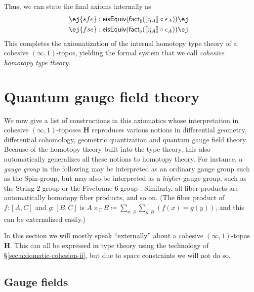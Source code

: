 \documentclass[copyright,12pt]{eptcs}
\makeatletter
\newcommand{\type}{\ensuremath{\mathsf{Type}}\xspace}
\renewcommand{\H}{\ensuremath{\mathbf{H}}\xspace}
\newcommand{\io}{\ensuremath{(\infty,1)}}
\newcommand{\factsharp}{\textsf{fact}_{\sharp}}
\newcommand{\factflat}{\textsf{fact}_{\flat}}
\def\jd#1{\@jd#1\ej}
\def\@jd#1|-#2\ej{\@@jd#1,,\;\vdash\;\left(#2\right)}
\def\@@jd#1,{\@ifmtarg{#1}{\let\next=\relax}{\left(#1\right)\let\next=\@@@jd}\next}
\def\@@@jd#1,{\@ifmtarg{#1}{\let\next=\relax}{,\,\left(#1\right)\let\next=\@@@jd}\next}
\makeatother
\begin{document}
Thus, we can state the final axioms internally as
\begin{gather}
  \jd{A:\sharp\type |- \mathsf{sfe}:\mathsf{eisEquiv} (\factsharp (\llbracket\eta_A\rrbracket \circ \epsilon_A))} \\
  \jd{A:\sharp\type |- \mathsf{fse}:\mathsf{eisEquiv} (\factflat (\llbracket\eta_A\rrbracket \circ \epsilon_A))}
\end{gather}
This completes the axiomatization of the internal homotopy type theory of a cohesive \io-topos, yielding the formal system that we call \emph{cohesive homotopy type theory}.






\section{Quantum gauge field theory}
\label{sec:quantum}

We now
give a list of constructions in this axiomatics
whose interpretation in cohesive
$(\infty,1)$-toposes \H reproduces various notions in differential geometry,
differential cohomology, geometric quantization and quantum gauge field theory.
Because of the homotopy theory built into the type theory, this also automatically generalizes
all these notions to homotopy theory.  For instance, a
\emph{gauge group} in the following may be interpreted as an ordinary gauge group such
as the Spin-group, but may also be interpreted as a \emph{higher} gauge
group, such as the String-2-group or the Fivebrane-6-group \cite{SSS}.
Similarly, all fiber products are automatically homotopy fiber products, and so on.
(The fiber product of $f:[A,C]$ and $g:[B,C]$ is $A\times_C B \coloneqq \sum_{x:A}\sum_{y:B}(f(x)=g(y))$, and this can be externalized easily.)

In this section we will mostly speak ``externally'' about a cohesive \io-topos \H.
This can all be expressed in type theory using the technology of \S\ref{sec:axiomatic-cohesion-ii}, but due to space constraints we will not do so.


\subsection{Gauge fields}
\end{document}
